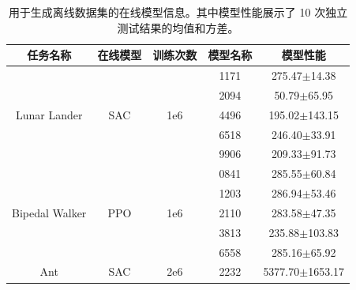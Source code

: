 \begin{table}[t]
    \small
    \centering
    \caption{
        用于生成离线数据集的在线模型信息。其中模型性能展示了 10 次独立测试结果的均值和方差。
        }
    \label{tab:the online models}
    \setlength{\tabcolsep}{0.3em}
    \renewcommand{\arraystretch}{1.1}
    \begin{tabular}{ccccc} 
    \toprule
    \textbf{任务名称}              & \textbf{在线模型} & \textbf{训练次数}  & \textbf{模型名称} & \textbf{模型性能}  \\ 
    \hline
    \multirow{5}{*}{Lunar Lander}   & \multirow{5}{*}{SAC}  & \multirow{5}{*}{1e6} & 1171                & 275.47$\pm$14.38            \\
                                    &                       &                      & 2094                & 50.79$\pm$65.95             \\
                                    &                       &                      & 4496                & 195.02$\pm$143.15           \\
                                    &                       &                      & 6518                & 246.40$\pm$33.91            \\
                                    &                       &                      & 9906                & 209.33$\pm$91.73            \\ 
    \hline
    \multirow{5}{*}{Bipedal Walker} & \multirow{5}{*}{PPO}  & \multirow{5}{*}{1e6} & 0841                & 285.55$\pm$60.84            \\
                                    &                       &                      & 1203                & 286.94$\pm$53.46            \\
                                    &                       &                      & 2110                & 283.58$\pm$47.35            \\
                                    &                       &                      & 3813                & 235.88$\pm$103.83           \\
                                    &                       &                      & 6558                & 285.16$\pm$65.92            \\ 
    \hline
    \multirow{5}{*}{Ant}            & \multirow{5}{*}{SAC}  & \multirow{5}{*}{2e6} & 2232                & 5377.70$\pm$1653.17         \\

\end{tabular}
\end{table}
